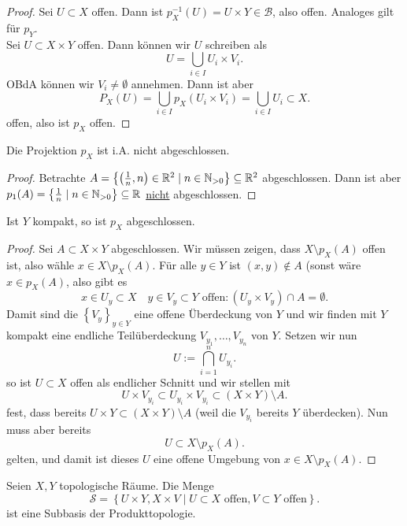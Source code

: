 \begin{proof}
    Sei $U\subset X$ offen. Dann ist $p_X^{-1}(U) = U\times Y\in \mathcal{B}$, also offen. Analoges gilt für $p_Y$. \\
    Sei $U\subset X\times Y$ offen. Dann können wir $U$ schreiben als
     \[
    U = \bigcup_{i \in  I} U_i \times V_i
    .\] 
    OBdA können wir $V_i \neq  \emptyset$ annehmen. Dann ist aber
    \[
        P_X(U) = \bigcup_{i \in  I} p_X(U_i \times V_i) = \bigcup_{i \in  I} U_i \subset X
    .\] 
    offen, also ist $p_X$ offen.
\end{proof}
\begin{remark}
    Die Projektion $p_X$ ist i.A. nicht abgeschlossen.
     \begin{proof}
         Betrachte $A = \left \{\left( \frac{1}{n},n \right) \in \mathbb{R}^2 \mid  n \in \mathbb{N}_{>0}\right\} \subseteq \mathbb{R}^2$  abgeschlossen. Dann ist aber $p_1(A) = \left \{\frac{1}{n}\mid n \in \mathbb{N}_{>0}\right\} \subseteq \mathbb{R}$ \underline{nicht} abgeschlossen.
    \end{proof}
\end{remark}
\begin{theorem}
    Ist $Y$ kompakt, so ist  $p_X$ abgeschlossen. 
\end{theorem}
\begin{proof}
    Sei $A\subset X\times Y$ abgeschlossen. Wir müssen zeigen, dass $X \setminus p_X(A)$ offen ist, also wähle $x\in X \setminus p_X(A)$. Für alle $y\in Y$ ist $(x,y) \not\in A$ (sonst wäre $x\in p_X(A)$, also gibt es 
    \[
        x\in U_y \subset X \quad y\in V_y \subset Y \text{ offen} \colon (U_y \times V_y) \cap A = \emptyset
    .\] 
    Damit sind die $\left \{V_y\right\} _{y\in Y}$ eine offene Überdeckung von $Y$ und  wir finden mit  $Y$ kompakt eine endliche Teilüberdeckung  $V_{y_1},\ldots,V_{y_n}$ von $Y$. Setzen wir nun
     \[
    U := \bigcap_{i =1}^n U_{y_i} 
    .\] 
    so ist $U\subset X$ offen als endlicher Schnitt und wir stellen mit
    \[
        U\times V_{y_i} \subset U_{y_i}\times V_{y_i}\subset (X\times Y) \setminus A
    .\] 
    fest, dass bereits $U\times Y\subset (X\times Y)\setminus A$ (weil die $V_{y_i}$ bereits $Y$ überdecken). Nun muss aber bereits
     \[
         U\subset X \setminus p_X(A)
    .\] 
    gelten, und damit ist dieses $U$ eine offene Umgebung von  $x\in X \setminus p_X(A)$.
\end{proof}
\begin{lemma}
    Seien $X,Y$ topologische Räume. Die Menge
     \[
    \mathcal{S} = \left \{U\times Y, X\times V \mid  U\subset X \text{ offen}, V\subset Y \text{ offen}\right\} 
    .\] 
    ist eine Subbasis der Produkttopologie.
\end{lemma}
